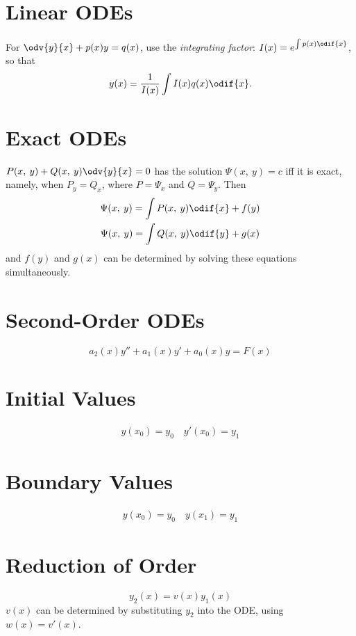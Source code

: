 \documentclass{article}
\begin{document}
\begin{multicols}{3}
    \section*{Linear ODEs}
    For \(\odv{y}{x} + p(x)y = q(x)\), use the \textit{integrating factor}:
    \(I(x) = e^{\int p(x) \odif{x}}\), so that
    \begin{equation*}
        y(x) = \frac{1}{I(x)} \int I(x) q(x) \odif{x}.
    \end{equation*}
    \section*{Exact ODEs}
    \(P(x,\: y) + Q(x,\: y)\odv{y}{x} = 0\)
    has the solution
    \(\Psi(x,\: y) = c\)
    iff it is exact, namely, when
    \(P_y = Q_x\),
    where \(P = \Psi_x\) and \(Q = \Psi_y\). Then
    \begin{gather*}
        \Psi(x,\: y) = \int P(x,\: y) \odif{x} + f(y) \\
        \Psi(x,\: y) = \int Q(x,\: y) \odif{y} + g(x)
    \end{gather*}
    and \(f(y)\) and \(g(x)\) can be determined by solving these equations simultaneously.
    \section*{Second-Order ODEs}
    \begin{equation*}
        a_2(x)y'' + a_1(x)y' + a_0(x)y = F(x)
    \end{equation*}
    \section*{Initial Values}
    \begin{align*}
        y(x_0) = y_0 \quad y'(x_0) = y_1
    \end{align*}
    \section*{Boundary Values}
    \begin{align*}
        y(x_0) = y_0 \quad y(x_1) = y_1
    \end{align*}
    \section*{Reduction of Order}
    \begin{equation*}
        y_2(x) = v\left(x\right) y_1(x)
    \end{equation*}
    \(v(x)\) can be determined by substituting \(y_2\) into the ODE, using \(w(x) = v'(x)\).

\end{multicols}
\end{document}

